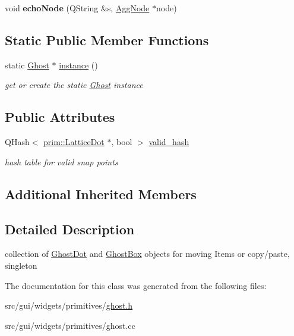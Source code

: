 \begin{DoxyCompactItemize}
\item 
void {\bfseries echo\+Node} (Q\+String \&s, \hyperlink{structprim_1_1AggNode}{Agg\+Node} $\ast$node)\hypertarget{classprim_1_1Ghost_ac6766dd582591462577331a9b93b60ea}{}\label{classprim_1_1Ghost_ac6766dd582591462577331a9b93b60ea}

\end{DoxyCompactItemize}
\subsection*{Static Public Member Functions}
\begin{DoxyCompactItemize}
\item 
static \hyperlink{classprim_1_1Ghost}{Ghost} $\ast$ \hyperlink{classprim_1_1Ghost_a16931bddd932d534b0926826d20e1e90}{instance} ()\hypertarget{classprim_1_1Ghost_a16931bddd932d534b0926826d20e1e90}{}\label{classprim_1_1Ghost_a16931bddd932d534b0926826d20e1e90}

\begin{DoxyCompactList}\small\item\em get or create the static \hyperlink{classprim_1_1Ghost}{Ghost} instance \end{DoxyCompactList}\end{DoxyCompactItemize}
\subsection*{Public Attributes}
\begin{DoxyCompactItemize}
\item 
Q\+Hash$<$ \hyperlink{classprim_1_1LatticeDot}{prim\+::\+Lattice\+Dot} $\ast$, bool $>$ \hyperlink{classprim_1_1Ghost_abdb2bd655baa8cb186477355ff1d7a57}{valid\+\_\+hash}\hypertarget{classprim_1_1Ghost_abdb2bd655baa8cb186477355ff1d7a57}{}\label{classprim_1_1Ghost_abdb2bd655baa8cb186477355ff1d7a57}

\begin{DoxyCompactList}\small\item\em hash table for valid snap points \end{DoxyCompactList}\end{DoxyCompactItemize}
\subsection*{Additional Inherited Members}


\subsection{Detailed Description}
collection of \hyperlink{classprim_1_1GhostDot}{Ghost\+Dot} and \hyperlink{classprim_1_1GhostBox}{Ghost\+Box} objects for moving Items or copy/paste, singleton 

The documentation for this class was generated from the following files\+:\begin{DoxyCompactItemize}
\item 
src/gui/widgets/primitives/\hyperlink{ghost_8h}{ghost.\+h}\item 
src/gui/widgets/primitives/ghost.\+cc\end{DoxyCompactItemize}
